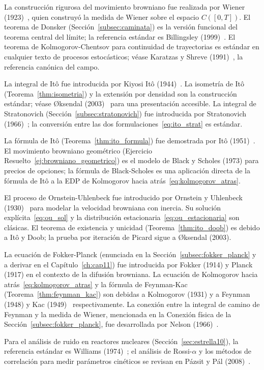 \begin{notasbib}
La construcción rigurosa del movimiento browniano fue realizada por Wiener
(1923)~\cite{wiener1923differential}, quien construyó la medida de Wiener sobre
el espacio $C([0,T])$. El teorema de Donsker (Sección~\ref{subsec:caminata})
es la versión funcional del teorema central del límite; la referencia estándar
es Billingsley (1999)~\cite{billingsley1999convergence}. El teorema de Kolmogorov-Chentsov
para continuidad de trayectorias es estándar en cualquier texto de procesos
estocásticos; véase Karatzas y Shreve (1991)~\cite{karatzas1991brownian}, la
referencia canónica del campo.

La integral de Itô fue introducida por Kiyosi Itô (1944)~\cite{ito1944stochastic}.
La isometría de Itô (Teorema~\ref{thm:isometria}) y la extensión por densidad
son la construcción estándar; véase Øksendal (2003)~\cite{oksendal2003stochastic}
para una presentación accesible. La integral de Stratonovich (Sección~\ref{subsec:stratonovich})
fue introducida por Stratonovich (1966)~\cite{stratonovich1966new}; la conversión
entre las dos formulaciones~\eqref{eq:ito_strat} es estándar.

La fórmula de Itô (Teorema~\ref{thm:ito_formula}) fue demostrada por Itô
(1951)~\cite{ito1951formula}. El movimiento browniano geométrico (Ejercicio
Resuelto~\ref{ej:browniano_geometrico}) es el modelo de Black y Scholes (1973)
para precios de opciones; la fórmula de Black-Scholes es una aplicación directa
de la fórmula de Itô a la EDP de Kolmogorov hacia atrás~\eqref{eq:kolmogorov_atras}.

El proceso de Ornstein-Uhlenbeck fue introducido por Ornstein y Uhlenbeck
(1930)~\cite{ornstein1930brownian} para modelar la velocidad browniana con
inercia. Su solución explícita~\eqref{eq:ou_sol} y la distribución
estacionaria~\eqref{eq:ou_estacionaria} son clásicas. El teorema de existencia
y unicidad (Teorema~\ref{thm:ito_doob}) es debido a Itô y Doob; la prueba por
iteración de Picard sigue a Øksendal (2003).

La ecuación de Fokker-Planck (enunciada en la Sección~\ref{subsec:fokker_planck}
y a derivar en el Capítulo~\ref{ch:cap11}) fue introducida por Fokker (1914) y
Planck (1917) en el contexto de la difusión browniana. La ecuación de Kolmogorov
hacia atrás~\eqref{eq:kolmogorov_atras} y la fórmula de Feynman-Kac
(Teorema~\ref{thm:feynman_kac}) son debidas a Kolmogorov (1931) y a Feynman
(1948) y Kac (1949)~\cite{kac1949distributions} respectivamente. La conexión
entre la integral de camino de Feynman y la medida de Wiener, mencionada en la
\textsf{Conexión física} de la Sección~\ref{subsec:fokker_planck}, fue
desarrollada por Nelson (1966)~\cite{nelson1966derivation}.

Para el análisis de ruido en reactores nucleares (Sección~\ref{sec:estrella10}),
la referencia estándar es Williams (1974)~\cite{williams1974random}; el análisis
de Rossi-$\alpha$ y los métodos de correlación para medir parámetros cinéticos
se revisan en Pázsit y Pál (2008)~\cite{pazsit2008neutron}.
\end{notasbib}

